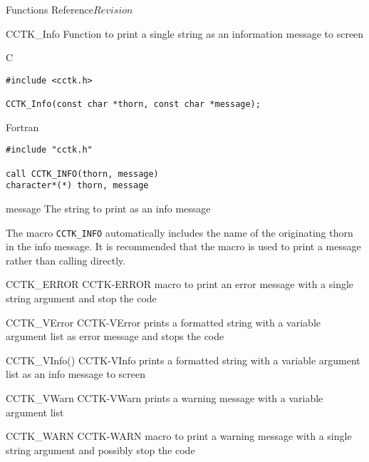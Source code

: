 \begin{cactuspart}{ Functions Reference}{}{$Revision$}
\begin{FunctionDescription}{CCTK\_Info}
\label{CCTK-Info}
Function to print a single string as an information message to screen

\begin{SynopsisSection}
\begin{Synopsis}{C}
\begin{verbatim}
#include <cctk.h>

CCTK_Info(const char *thorn, const char *message);
\end{verbatim}
\end{Synopsis}
\begin{Synopsis}{Fortran}
\begin{verbatim}
#include "cctk.h"

call CCTK_INFO(thorn, message)
character*(*) thorn, message
\end{verbatim}
\end{Synopsis}
\end{SynopsisSection}

\begin{ParameterSection}
\begin{Parameter}{message}
The string to print as an info message
\end{Parameter}
\end{ParameterSection}

\begin{Discussion}
The macro \verb|CCTK_INFO| automatically includes the name of the originating
thorn in the info message. It is recommended that the macro 
is used to print a message rather than calling  directly.
\end{Discussion}

\begin{SeeAlsoSection}
\begin{SeeAlso2} {CCTK\_ERROR} {CCTK-ERROR}
macro to print an error message with a single string argument and stop
the code
\end{SeeAlso2}
\begin{SeeAlso2} {CCTK\_VError} {CCTK-VError}
prints a formatted string with a variable argument list as error
message and stops the code
\end{SeeAlso2}
\begin{SeeAlso2} {CCTK\_VInfo()} {CCTK-VInfo}
prints a formatted string with a variable argument list as an info message to
screen
\end{SeeAlso2}
\begin{SeeAlso2} {CCTK\_VWarn} {CCTK-VWarn}
prints a warning message with a variable argument list
\end{SeeAlso2}
\begin{SeeAlso2} {CCTK\_WARN} {CCTK-WARN}
macro to print a warning message with a single string argument and
possibly stop the code
\end{SeeAlso2}
\end{SeeAlsoSection}


\end{FunctionDescription}
\end{cactuspart}
